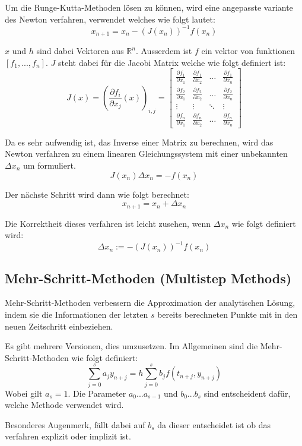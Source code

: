 Um die Runge-Kutta-Methoden lösen zu können, wird eine angepasste variante des Newton verfahren, verwendet
welches wie folgt lautet:
$$
x_{n+1} = x_n - (J(x_n))^{-1} f(x_n)
$$

$x$ und $h$ sind dabei Vektoren aus $\mathbb{R}^n$. 
Ausserdem ist $f$ ein vektor von funktionen $[f_1, ..., f_n]$.
$J$ steht dabei für die Jacobi Matrix welche wie folgt definiert ist:
$$
J(x) = \left( \frac{\partial f_i}{\partial x_j}(x) \right)_{i, j} = \begin{bmatrix}
\frac{\partial f_1}{\partial x_1} & \frac{\partial f_1}{\partial x_2} & \dots & \frac{\partial f_1}{\partial x_n} \\
\frac{\partial f_2}{\partial x_1} & \frac{\partial f_2}{\partial x_2} & \dots & \frac{\partial f_2}{\partial x_n} \\
\vdots & \vdots & \ddots & \vdots \\
\frac{\partial f_n}{\partial x_1} & \frac{\partial f_n}{\partial x_2} & \dots & \frac{\partial f_n}{\partial x_n}
\end{bmatrix}
$$

Da es sehr aufwendig ist, das Inverse einer Matrix zu berechnen, wird das Newton verfahren zu einem linearen Gleichungssystem mit einer unbekannten $\Delta x_n$ um formuliert.
$$
J(x_n) \Delta x_n = -f(x_n)
$$

Der nächste Schritt wird dann wie folgt berechnet:
$$
x_{n+1} = x_n + \Delta x_n
$$

Die Korrektheit dieses verfahren ist leicht zusehen, wenn $\Delta x_n $
wie folgt definiert wird:
$$
\Delta x_n := -(J(x_n))^{-1} f(x_n)
$$


\subsection{Mehr-Schritt-Methoden (Multistep Methods)} \label{sec:multi_step}

Mehr-Schritt-Methoden verbessern die Approximation der analytischen Lösung, indem sie 
die Informationen der letzten $s$ bereits berechneten Punkte mit in den neuen Zeitschritt einbeziehen.

Es gibt mehrere Versionen, dies umzusetzen.
Im Allgemeinen sind die Mehr-Schritt-Methoden wie folgt definiert:
$$
\sum_{j= 0}^{s} a_j y_{n+j} = h \sum_{j=0}^s b_j f(t_{n+j}, y_{n+j})
$$
Wobei gilt $a_s= 1$.  Die Parameter $a_0 ... a_{s-1}$ und $b_0 ... b_{s}$ sind entscheident dafür, welche Methode verwendet wird.

Besonderes Augenmerk, fällt dabei auf $b_s$ da dieser entscheidet ist ob das verfahren explizit oder implizit ist.

